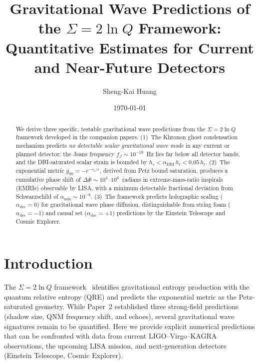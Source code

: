 \documentclass[prl,twocolumn,superscriptaddress,longbibliography]{revtex4-2}
\newcommand{\rs}{r_{\mathrm{s}}}
\begin{document}
\title{Gravitational Wave Predictions of the $\Sigma = 2\ln Q$ Framework:\\
Quantitative Estimates for Current and Near-Future Detectors}

\author{Sheng-Kai Huang}

\date{\today}

\begin{abstract}
We derive three specific, testable gravitational wave predictions
from the $\Sigma = 2\ln Q$ framework developed in the companion
papers.  (1)~The Khronon ghost condensation mechanism predicts
\emph{no detectable scalar gravitational wave mode} in any current
or planned detector: the Jeans frequency $f_J \sim 10^{-19}$~Hz
lies far below all detector bands, and the DBI-saturated scalar
strain is bounded by $h_s < \alpha_{\mathrm{DBI}}\,h_t < 0.05\,h_t$.
(2)~The exponential metric $g_{00} = -e^{-\rs/r}$, derived from
Petz bound saturation, produces a cumulative phase shift of
$\Delta\Phi \sim 10^4$--$10^6$~radians in extreme-mass-ratio
inspirals (EMRIs) observable by LISA, with a minimum detectable
fractional deviation from Schwarzschild of $\alpha_{\min}
\sim 10^{-6}$.  (3)~The framework predicts holographic scaling
($\alpha_{\mathrm{dec}} = 0$) for gravitational wave phase
diffusion, distinguishable from string foam ($\alpha_{\mathrm{dec}}
= -1$) and causal set ($\alpha_{\mathrm{dec}} = +1$) predictions
by the Einstein Telescope and Cosmic Explorer.
\end{abstract}

\maketitle

\section{Introduction}

The $\Sigma = 2\ln Q$ framework~\cite{Paper1,Paper2,Paper3}
identifies gravitational entropy production with the quantum
relative entropy (QRE) and predicts the exponential metric as
the Petz-saturated geometry.  While Paper~2 established three
strong-field predictions (shadow size, QNM frequency shift,
and echoes), several gravitational wave signatures remain to
be quantified.  Here we provide explicit numerical predictions
that can be confronted with data from current LIGO--Virgo--KAGRA
observations, the upcoming LISA mission, and next-generation
detectors (Einstein Telescope, Cosmic Explorer).
\end{document}
